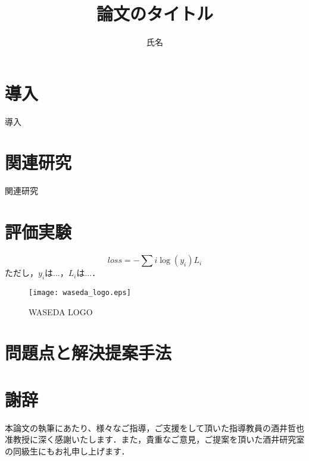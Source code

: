 \documentclass[12pt,dvipdfmx]{jsbook}
\title{論文のタイトル}
\affiliation{早稲田大学基幹理工学部情報理工学科}
\author{氏名}
\begin{document}
\maketitle

\begin{coverabstract}

\end{coverabstract}

\tableofcontents

\vspace*{1cm}\par
\chapter{導入}
\label{sec:introduction}
導入

\chapter{関連研究}
\label{sec:related_work}
関連研究\cite{RSL}

\chapter{評価実験}
\begin{equation}
    loss = -\sum{i}{}\log (y_i)L_i
\end{equation}
ただし，$y_i$は...，$L_i$は...．

\begin{figure}[h]
  \centering
  \texttt{[image: waseda\_logo.eps]}
  \caption{WASEDA LOGO}
  \label{logo}
\end{figure}

\chapter{問題点と解決提案手法}

\chapter*{謝辞}
本論文の執筆にあたり、様々なご指導，ご支援をして頂いた指導教員の酒井哲也准教授に深く感謝いたします．また，貴重なご意見，ご提案を頂いた酒井研究室の同級生にもお礼申し上げます．
\newpage



\newpage

%
%
\end{document}

